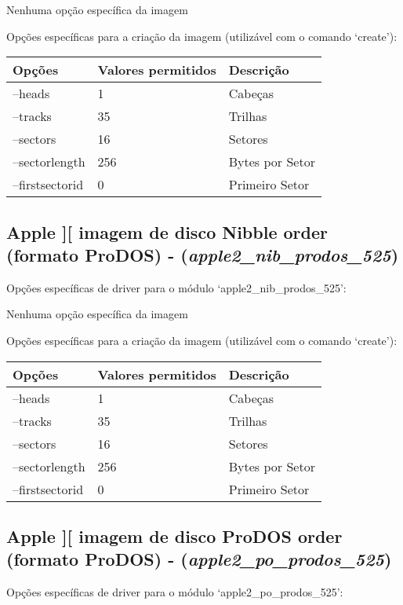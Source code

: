 \documentclass[letterpaper,10pt,brazil]{sphinxmanual}
\begin{document}
Nenhuma opção específica da imagem

Opções específicas para a criação da imagem (utilizável com o comando `create'):

\noindent\begin{tabulary}{\linewidth}{|L|L|L|}
\hline

Opções
&
Valores permitidos
&
Descrição
\\
\hline
--heads
&
1
&
Cabeças
\\
\hline
--tracks
&
35
&
Trilhas
\\
\hline
--sectors
&
16
&
Setores
\\
\hline
--sectorlength
&
256
&
Bytes por Setor
\\
\hline
--firstsectorid
&
0
&
Primeiro Setor
\\
\hline\end{tabulary}



\subsection{Apple {]}{[} imagem de disco Nibble order (formato ProDOS) - (\emph{apple2\_nib\_prodos\_525})}
\label{tools/imgtool:apple-imagem-de-disco-nibble-order-formato-prodos-apple2-nib-prodos-525}
Opções específicas de driver para o módulo `apple2\_nib\_prodos\_525':

Nenhuma opção específica da imagem

Opções específicas para a criação da imagem (utilizável com o comando `create'):

\noindent\begin{tabulary}{\linewidth}{|L|L|L|}
\hline

Opções
&
Valores permitidos
&
Descrição
\\
\hline
--heads
&
1
&
Cabeças
\\
\hline
--tracks
&
35
&
Trilhas
\\
\hline
--sectors
&
16
&
Setores
\\
\hline
--sectorlength
&
256
&
Bytes por Setor
\\
\hline
--firstsectorid
&
0
&
Primeiro Setor
\\
\hline\end{tabulary}



\subsection{Apple {]}{[} imagem de disco ProDOS order (formato ProDOS) - (\emph{apple2\_po\_prodos\_525})}
\label{tools/imgtool:apple-imagem-de-disco-prodos-order-formato-prodos-apple2-po-prodos-525}
Opções específicas de driver para o módulo `apple2\_po\_prodos\_525':
\end{document}
